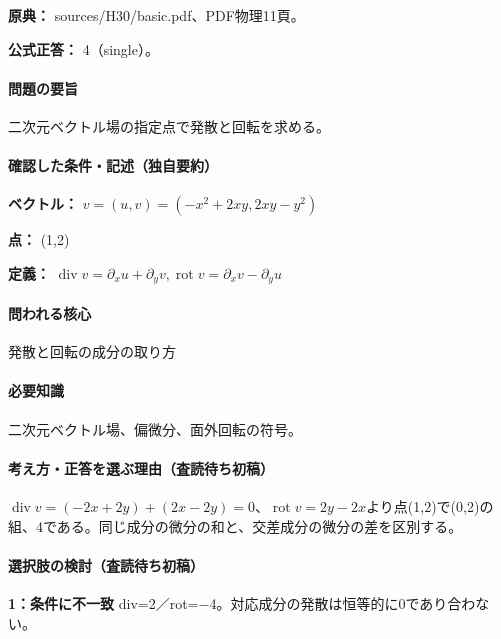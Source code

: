 \noindent\textbf{原典：} sources/H30/basic.pdf、PDF物理11頁。

\textbf{公式正答：} 4（single）。

\paragraph{問題の要旨} 二次元ベクトル場の指定点で発散と回転を求める。

\paragraph{確認した条件・記述（独自要約）}\mbox{}\par

\noindent\textbf{ベクトル：} \(v=(u,v)=(-x^2+2xy,2xy-y^2)\)\par

\noindent\textbf{点：} (1,2)\par

\noindent\textbf{定義：} \(\operatorname{div}v=\partial_xu+\partial_yv,\operatorname{rot}v=\partial_xv-\partial_yu\)\par

\paragraph{問われる核心} 発散と回転の成分の取り方

\paragraph{必要知識} 二次元ベクトル場、偏微分、面外回転の符号。

\paragraph{考え方・正答を選ぶ理由（査読待ち初稿）} \(\operatorname{div}v=(-2x+2y)+(2x-2y)=0\)、\(\operatorname{rot}v=2y-2x\)より点(1,2)で(0,2)の組、4である。同じ成分の微分の和と、交差成分の微分の差を区別する。

\paragraph{選択肢の検討（査読待ち初稿）}\mbox{}\par

\noindent\textbf{1：条件に不一致} div=\allowbreak{}2／rot=−4。対応成分の発散は恒等的に0であり合わない。\par

